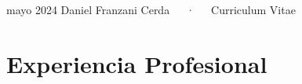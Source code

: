 \documentclass[11pt,a4paper,]{awesome-cv}
\begin{document}
\makecvheader

\makecvfooter
  {mayo 2024}
    { Daniel Franzani Cerda~~~·~~~Curriculum Vitae}
  {\thepage}





\section{Experiencia Profesional}\label{experiencia-profesional}
\end{document}
